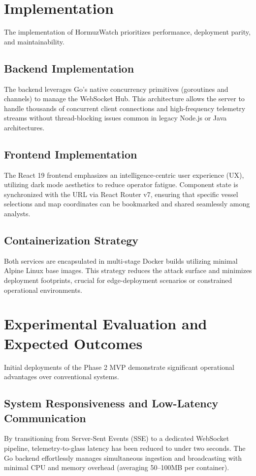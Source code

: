 \documentclass[11pt,a4paper]{article}
\begin{document}
\section{Implementation}
The implementation of HormuzWatch prioritizes performance, deployment parity, and maintainability.

\subsection{Backend Implementation}
The backend leverages Go's native concurrency primitives (goroutines and channels) to manage the WebSocket Hub. This architecture allows the server to handle thousands of concurrent client connections and high-frequency telemetry streams without thread-blocking issues common in legacy Node.js or Java architectures.

\subsection{Frontend Implementation}
The React 19 frontend emphasizes an intelligence-centric user experience (UX), utilizing dark mode aesthetics to reduce operator fatigue. Component state is synchronized with the URL via React Router v7, ensuring that specific vessel selections and map coordinates can be bookmarked and shared seamlessly among analysts.

\subsection{Containerization Strategy}
Both services are encapsulated in multi-stage Docker builds utilizing minimal Alpine Linux base images. This strategy reduces the attack surface and minimizes deployment footprints, crucial for edge-deployment scenarios or constrained operational environments.

\section{Experimental Evaluation and Expected Outcomes}
Initial deployments of the Phase 2 MVP demonstrate significant operational advantages over conventional systems.

\subsection{System Responsiveness and Low-Latency Communication}
By transitioning from Server-Sent Events (SSE) to a dedicated WebSocket pipeline, telemetry-to-glass latency has been reduced to under two seconds. The Go backend effortlessly manages simultaneous ingestion and broadcasting with minimal CPU and memory overhead (averaging 50–100MB per container).
\end{document}
